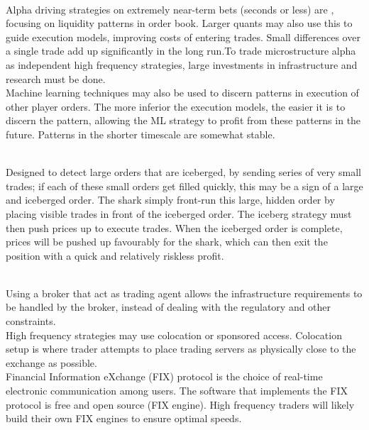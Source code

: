 \begin{definition} \\
Alpha driving strategies on extremely near-term bets (seconds or less) are , focusing on liquidity patterns in order book. Larger quants may also use this to guide execution models, improving costs of entering trades. Small differences over a single trade add up significantly in the long run.To trade microstructure alpha as independent high frequency strategies, large investments in infrastructure and research must be done.\\
Machine learning techniques may also be used to discern patterns in execution of other player orders. The more inferior the execution models, the easier it is to discern the pattern, allowing the ML strategy to profit from these patterns in the future. Patterns in the shorter timescale are somewhat stable.
\end{definition}

\begin{definition} \\
Designed to detect large orders that are iceberged, by sending series of very small trades; if each of these small orders get filled quickly, this may be a sign of a large and iceberged order. The shark simply front-run this large, hidden order by placing visible trades in front of the iceberged order. The iceberg strategy must then push prices up to execute trades. When the iceberged order is complete, prices will be pushed up favourably for the shark, which can then exit the position with a quick and relatively riskless profit.
\end{definition}

\begin{remark} \\
Using a broker that act as trading agent allows the infrastructure requirements to be handled by the broker, instead of dealing with the regulatory and other constraints. \\
High frequency strategies may use colocation or sponsored access. Colocation setup is where trader attempts to place trading servers as physically close to the exchange as possible.\\
Financial Information eXchange (FIX) protocol is the choice of real-time electronic communication among users. The software that implements the FIX protocol is free and open source (FIX engine). High frequency traders will likely build their own FIX engines to ensure optimal speeds.
\end{remark}